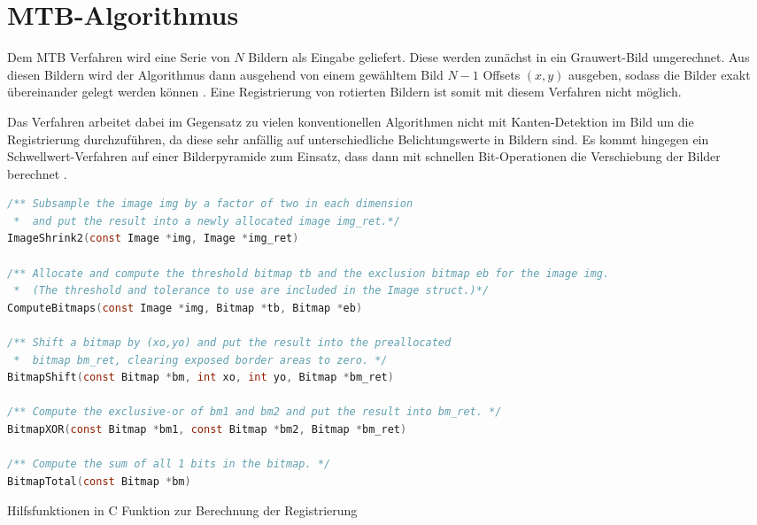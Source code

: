 \section{MTB-Algorithmus}
\label{subsec:MTB}
Dem \gls{MTB} Verfahren \cite[S.9 f]{Ward03fast} wird eine Serie von $N$ Bildern als Eingabe geliefert. Diese werden zunächst in ein Grauwert-Bild umgerechnet. Aus diesen Bildern wird der Algorithmus dann ausgehend von einem gewähltem Bild $N-1$ Offsets $(x,y)$ ausgeben, sodass die Bilder exakt übereinander gelegt werden können \cite[S. 123f]{Reinhard}. Eine Registrierung von rotierten Bildern ist somit mit diesem Verfahren nicht möglich. 

Das Verfahren arbeitet dabei im Gegensatz zu vielen konventionellen Algorithmen nicht mit Kanten-Detektion im Bild um die Registrierung durchzuführen, da diese sehr anfällig auf unterschiedliche Belichtungswerte in Bildern sind. Es kommt hingegen ein Schwellwert-Verfahren auf einer Bilderpyramide zum Einsatz, dass dann mit schnellen Bit-Operationen die Verschiebung der Bilder berechnet  \cite{Ward03fast}. 

\begin{Listing}[H]
\label{lst:MTB:helpers}
\begin{lstlisting}[language=c]
/** Subsample the image img by a factor of two in each dimension 
 *  and put the result into a newly allocated image img_ret.*/
ImageShrink2(const Image *img, Image *img_ret)

/** Allocate and compute the threshold bitmap tb and the exclusion bitmap eb for the image img. 
 *  (The threshold and tolerance to use are included in the Image struct.)*/
ComputeBitmaps(const Image *img, Bitmap *tb, Bitmap *eb)

/** Shift a bitmap by (xo,yo) and put the result into the preallocated 
 *  bitmap bm_ret, clearing exposed border areas to zero. */
BitmapShift(const Bitmap *bm, int xo, int yo, Bitmap *bm_ret)

/** Compute the exclusive-or of bm1 and bm2 and put the result into bm_ret. */
BitmapXOR(const Bitmap *bm1, const Bitmap *bm2, Bitmap *bm_ret)

/** Compute the sum of all 1 bits in the bitmap. */
BitmapTotal(const Bitmap *bm)
\end{lstlisting}
\caption{Hilfsfunktionen in C Funktion zur Berechnung der Registrierung \cite{Ward03fast}}

\end{Listing}

